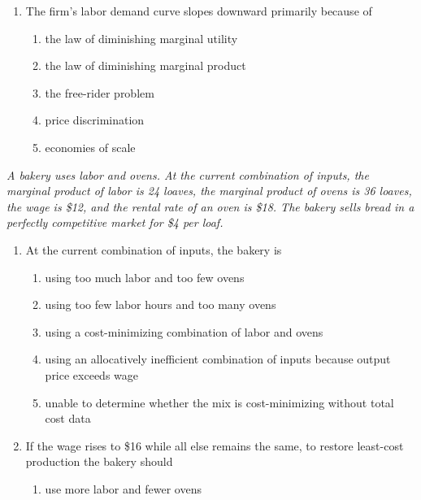 \documentclass[10pt]{article}
\newenvironment{choiceslist}
  {\begin{enumerate}[label=(\Alph*), leftmargin=1.6em, itemsep=0.12em, topsep=0.18em, parsep=0pt]}
  {\end{enumerate}}
\newenvironment{stimulus}
  {\begin{center}\begin{minipage}{0.96\columnwidth}\footnotesize\itshape\setlength{\tabcolsep}{3pt}\renewcommand{\arraystretch}{0.96}}
  {\end{minipage}\end{center}}
\begin{document}
\begin{multicols*}{2}
\begin{enumerate}[resume*=apq, leftmargin=*, itemsep=0.85em, topsep=0.2em, parsep=0pt]
\begin{choiceslist}
\item 2 workers
\item 3 workers
\item 4 workers
\item 5 workers
\item the same number of workers because labor demand depends only on product price
\end{choiceslist}
\item The firm's labor demand curve slopes downward primarily because of
\begin{choiceslist}
\item the law of diminishing marginal utility
\item the law of diminishing marginal product
\item the free-rider problem
\item price discrimination
\item economies of scale
\end{choiceslist}
\end{enumerate}
\begin{stimulus}
A bakery uses labor and ovens. At the current combination of inputs, the marginal product of labor is 24 loaves, the marginal product of ovens is 36 loaves, the wage is \$12, and the rental rate of an oven is \$18. The bakery sells bread in a perfectly competitive market for \$4 per loaf.
\end{stimulus}
\begin{enumerate}[resume*=apq, leftmargin=*, itemsep=0.85em, topsep=0.2em, parsep=0pt]
\item At the current combination of inputs, the bakery is
\begin{choiceslist}
\item using too much labor and too few ovens
\item using too few labor hours and too many ovens
\item using a cost-minimizing combination of labor and ovens
\item using an allocatively inefficient combination of inputs because output price exceeds wage
\item unable to determine whether the mix is cost-minimizing without total cost data
\end{choiceslist}
\item If the wage rises to \$16 while all else remains the same, to restore least-cost production the bakery should
\begin{choiceslist}
\item use more labor and fewer ovens

\end{choiceslist}
\end{enumerate}
\end{multicols*}
\end{document}
